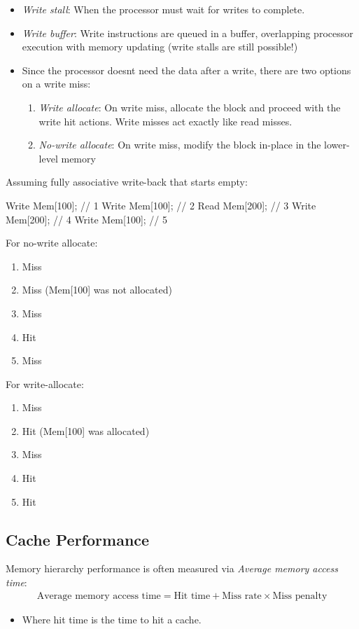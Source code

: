 \begin{itemize}
  \item \textit{Write stall}: When the processor must wait for writes to complete.
  \item \textit{Write buffer}: Write instructions are queued in a buffer, overlapping processor execution with memory updating (write stalls are still possible!)
  \item Since the processor doesnt need the data after a write, there are two options on a write miss:
  \begin{enumerate}
    \item \textit{Write allocate}: On write miss, allocate the block and proceed with the write hit actions. Write misses act exactly like read misses.
    \item \textit{No-write allocate}: On write miss, modify the block in-place in the lower-level memory
  \end{enumerate}
\end{itemize}
Assuming fully associative write-back that starts empty:
\begin{bashcode}
Write Mem[100]; // 1
Write Mem[100]; // 2
Read  Mem[200]; // 3
Write Mem[200]; // 4
Write Mem[100]; // 5
\end{bashcode}
For no-write allocate:
\begin{enumerate}
  \item Miss
  \item Miss (Mem[100] was not allocated)
  \item Miss 
  \item Hit 
  \item Miss
\end{enumerate}
For write-allocate:
\begin{enumerate}
  \item Miss 
  \item Hit (Mem[100] was allocated) 
  \item Miss 
  \item Hit 
  \item Hit
\end{enumerate}
\subsection{Cache Performance}
Memory hierarchy performance is often measured via \textit{Average memory access time}:
\begin{align}
  \text{Average memory access time} = \text{Hit time} + \text{Miss rate} \times \text{Miss penalty}
\end{align}
\begin{itemize}
  \item Where hit time is the time to hit a cache.
\end{itemize}
